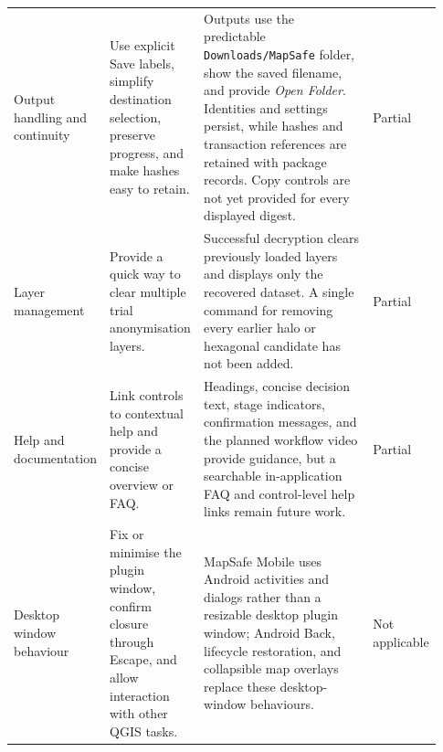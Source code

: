 \documentclass[a4paper,UKenglish,cleveref,autoref,thm-restate]{lipics-v2021}
\begin{document}
{\begin{longtable}{@{}p{0.16\linewidth}p{0.22\linewidth}p{0.40\linewidth}p{0.15\linewidth}@{}}
Output handling and continuity & Use explicit Save labels, simplify destination selection, preserve progress, and make hashes easy to retain. & Outputs use the predictable \texttt{Downloads/MapSafe} folder, show the saved filename, and provide \emph{Open Folder}. Identities and settings persist, while hashes and transaction references are retained with package records. Copy controls are not yet provided for every displayed digest. & Partial \\

Layer management & Provide a quick way to clear multiple trial anonymisation layers. & Successful decryption clears previously loaded layers and displays only the recovered dataset. A single command for removing every earlier halo or hexagonal candidate has not been added. & Partial \\

Help and documentation & Link controls to contextual help and provide a concise overview or FAQ. & Headings, concise decision text, stage indicators, confirmation messages, and the planned workflow video provide guidance, but a searchable in-application FAQ and control-level help links remain future work. & Partial \\

Desktop window behaviour & Fix or minimise the plugin window, confirm closure through Escape, and allow interaction with other QGIS tasks. & MapSafe Mobile uses Android activities and dialogs rather than a resizable desktop plugin window; Android Back, lifecycle restoration, and collapsible map overlays replace these desktop-window behaviours. & Not applicable \\
\end{longtable}
}

\clearpage

\end{document}
